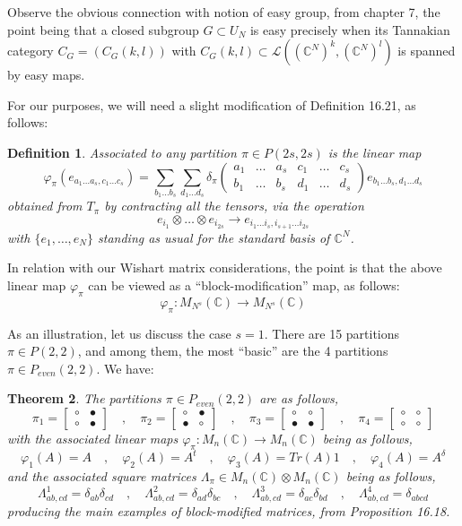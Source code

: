 \documentclass[12pt]{amsbook}
\newtheorem{theorem}{Theorem}[chapter]
\newtheorem{definition}[theorem]{Definition}
\begin{document}
Observe the obvious connection with notion of easy group, from chapter 7, the point being that a closed subgroup $G\subset U_N$ is easy precisely when its Tannakian category $C_G=(C_G(k,l))$ with $C_G(k,l)\subset\mathcal L((\mathbb C^N)^k,(\mathbb C^N)^l)$ is spanned by easy maps. 

\bigskip

For our purposes, we will need a slight modification of Definition 16.21, as follows:

\begin{definition}
Associated to any partition $\pi\in P(2s,2s)$ is the linear map
$$\varphi_\pi(e_{a_1\ldots a_s,c_1\ldots c_s})=\sum_{b_1\ldots b_s}\sum_{d_1\ldots d_s}\delta_\pi\begin{pmatrix}a_1&\ldots&a_s&c_1&\ldots&c_s\\ b_1&\ldots&b_s&d_1&\ldots&d_s\end{pmatrix}e_{b_1\ldots b_s,d_1\ldots d_s}$$
obtained from $T_\pi$ by contracting all the tensors, via the operation
$$e_{i_1}\otimes\ldots\otimes e_{i_{2s}}\to e_{i_1\ldots i_s,i_{s+1}\ldots i_{2s}}$$
with $\{e_1,\ldots,e_N\}$ standing as usual for the standard basis of $\mathbb C^N$.
\end{definition}

In relation with our Wishart matrix considerations, the point is that the above linear map $\varphi_\pi$ can be viewed as a ``block-modification'' map, as follows:
$$\varphi_\pi:M_{N^s}(\mathbb C)\to M_{N^s}(\mathbb C)$$

As an illustration, let us discuss the case $s=1$. There are 15 partitions $\pi\in P(2,2)$, and among them, the most ``basic'' are the 4 partitions $\pi\in P_{even}(2,2)$. We have:

\begin{theorem}
The partitions $\pi\in P_{even}(2,2)$ are as follows,
$$\pi_1=\begin{bmatrix}\circ&\bullet\\ \circ&\bullet\end{bmatrix}\quad,\quad
\pi_2=\begin{bmatrix}\circ&\bullet\\ \bullet&\circ\end{bmatrix}\quad,\quad
\pi_3=\begin{bmatrix}\circ&\circ\\ \bullet&\bullet\end{bmatrix}\quad,\quad
\pi_4=\begin{bmatrix}\circ&\circ\\ \circ&\circ\end{bmatrix}$$
with the associated linear maps $\varphi_\pi:M_n(\mathbb C)\to M_n(\mathbb C)$ being as follows,
$$\varphi_1(A)=A\quad,\quad
\varphi_2(A)=A^t\quad,\quad
\varphi_3(A)=Tr(A)1\quad,\quad
\varphi_4(A)=A^\delta$$
and the associated square matrices $\Lambda_\pi\in M_n(\mathbb C)\otimes M_n(\mathbb C)$ being as follows,
$$\Lambda^1_{ab,cd}=\delta_{ab}\delta_{cd}\quad,\quad 
\Lambda^2_{ab,cd}=\delta_{ad}\delta_{bc}\quad,\quad
\Lambda^3_{ab,cd}=\delta_{ac}\delta_{bd}\quad,\quad
\Lambda^4_{ab,cd}=\delta_{abcd}$$
producing the main examples of block-modified matrices, from Proposition 16.18.
\end{theorem}
\end{document}
